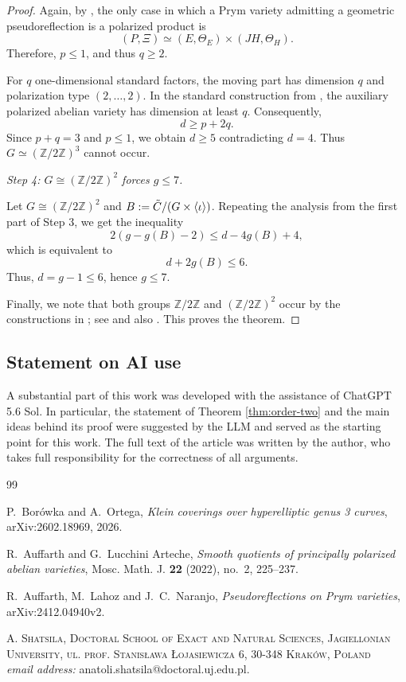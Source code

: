 \documentclass{article}
\numberwithin{equation}{section}
\newcommand{\ZZ}{\mathbb Z}
\newcommand{\tC}{\Tilde{C}}
\begin{document}
\begin{proof}
Again, by \cite[Remark 4.2]{ALN}, the only case in which a Prym variety admitting
a geometric pseudoreflection is a polarized product is $$(P,\Xi)\simeq (E,\Theta_E)\times(JH,\Theta_H).$$
Therefore, $p\leq 1$, and thus $q\geq2$.

For $q$ one-dimensional standard factors, the moving part has dimension
$q$ and polarization type $(2,\ldots,2)$. In the standard construction from \cite{ALA}, the auxiliary polarized abelian variety has dimension at least $q$. Consequently, $$d\ge p+2q.$$
Since $p+q=3$ and $p\leq 1$, we obtain
$d \geq 5$
contradicting \(d=4\). Thus \(G\simeq(\ZZ/2\ZZ)^3\) cannot occur.

\medskip
\noindent\textit{Step 4: $G \cong (\mathbb{Z}/2\mathbb{Z})^2$ forces $g \leq 7$.}

Let $G \cong (\mathbb{Z}/2\mathbb{Z})^2$ and $B := \tC / (G \times \langle\iota\rangle)$. Repeating the analysis from the first part of Step 3, we get the inequality $$2(g - g(B) - 2) \leq d - 4g(B) + 4,$$ which is equivalent to $$d+2g(B) \leq 6.$$ Thus, $d = g-1 \leq 6$, hence $g \leq 7$.

Finally, we note that both groups $\ZZ/2\ZZ$ and $(\ZZ/2\ZZ)^2$ occur by the constructions in \cite{ALN}; see \cite[Remark 5.2]{ALN} and also \cite[Remark 2.7]{BO26}. This proves the theorem.
\end{proof}


\subsection*{Statement on AI use}
A substantial part of this work was developed with the assistance of ChatGPT 5.6 Sol. In particular, the statement of Theorem \ref{thm:order-two} and the main ideas behind its proof were suggested by the LLM and served as the starting point for this work. The full text of the article was written by the author, who takes full responsibility for the correctness of all arguments.

\begin{thebibliography}{99}

P.~Borówka and A.~Ortega,
\emph{Klein coverings over hyperelliptic genus 3 curves},
arXiv:2602.18969, 2026.

R.~Auffarth and G.~Lucchini Arteche,
\emph{Smooth quotients of principally polarized abelian varieties},
Mosc. Math. J. \textbf{22} (2022), no.~2, 225--237.

R.~Auffarth, M.~Lahoz and J.~C.~Naranjo,
\emph{Pseudoreflections on Prym varieties},
arXiv:2412.04940v2.

\end{thebibliography}


\textsc{A. Shatsila, Doctoral School of Exact and Natural Sciences, Jagiellonian University, ul. prof. Stanisława Łojasiewicza 6, 30-348 Kraków, Poland}\\
\textit{email address:} anatoli.shatsila@doctoral.uj.edu.pl.
\end{document}
